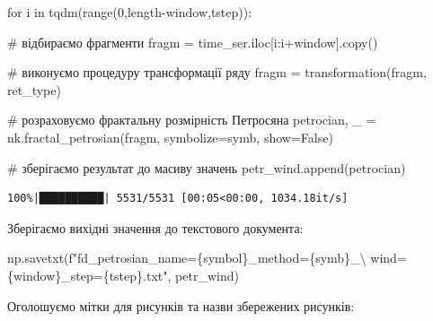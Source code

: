 \documentclass[
  letterpaper,
]{report}
\newenvironment{Shaded}{\begin{snugshade}}{\end{snugshade}}
\newcommand{\BuiltInTok}[1]{\textcolor[rgb]{0.00,0.23,0.31}{#1}}
\newcommand{\CharTok}[1]{\textcolor[rgb]{0.13,0.47,0.30}{#1}}
\newcommand{\CommentTok}[1]{\textcolor[rgb]{0.37,0.37,0.37}{#1}}
\newcommand{\ControlFlowTok}[1]{\textcolor[rgb]{0.00,0.23,0.31}{#1}}
\newcommand{\DecValTok}[1]{\textcolor[rgb]{0.68,0.00,0.00}{#1}}
\newcommand{\KeywordTok}[1]{\textcolor[rgb]{0.00,0.23,0.31}{#1}}
\newcommand{\NormalTok}[1]{\textcolor[rgb]{0.00,0.23,0.31}{#1}}
\newcommand{\OperatorTok}[1]{\textcolor[rgb]{0.37,0.37,0.37}{#1}}
\newcommand{\SpecialCharTok}[1]{\textcolor[rgb]{0.37,0.37,0.37}{#1}}
\newcommand{\SpecialStringTok}[1]{\textcolor[rgb]{0.13,0.47,0.30}{#1}}
\newcommand{\VariableTok}[1]{\textcolor[rgb]{0.07,0.07,0.07}{#1}}
\begin{document}
\begin{Shaded}
\begin{Highlighting}[]
\ControlFlowTok{for}\NormalTok{ i }\KeywordTok{in}\NormalTok{ tqdm(}\BuiltInTok{range}\NormalTok{(}\DecValTok{0}\NormalTok{,length}\OperatorTok{{-}}\NormalTok{window,tstep)):}
    
    \CommentTok{\# відбираємо фрагменти}
\NormalTok{    fragm }\OperatorTok{=}\NormalTok{ time\_ser.iloc[i:i}\OperatorTok{+}\NormalTok{window].copy()  }

    \CommentTok{\# виконуємо процедуру трансформації ряду }
\NormalTok{    fragm }\OperatorTok{=}\NormalTok{ transformation(fragm, ret\_type)}

    \CommentTok{\# розраховуємо фрактальну розмірність Петросяна}
\NormalTok{    petrocian, \_ }\OperatorTok{=}\NormalTok{ nk.fractal\_petrosian(fragm, }
\NormalTok{                                        symbolize}\OperatorTok{=}\NormalTok{symb, }
\NormalTok{                                        show}\OperatorTok{=}\VariableTok{False}\NormalTok{)}

    \CommentTok{\# зберігаємо результат до масиву значень}
\NormalTok{    petr\_wind.append(petrocian)}
\end{Highlighting}
\end{Shaded}

\begin{verbatim}
100%|██████████| 5531/5531 [00:05<00:00, 1034.18it/s]
\end{verbatim}

Зберігаємо вихідні значення до текстового документа:

\begin{Shaded}
\begin{Highlighting}[]
\NormalTok{np.savetxt(}\SpecialStringTok{f"fd\_petrosian\_name=}\SpecialCharTok{\{}\NormalTok{symbol}\SpecialCharTok{\}}\SpecialStringTok{\_method=}\SpecialCharTok{\{}\NormalTok{symb}\SpecialCharTok{\}}\SpecialStringTok{\_}\CharTok{\textbackslash{}}
\SpecialStringTok{           wind=}\SpecialCharTok{\{}\NormalTok{window}\SpecialCharTok{\}}\SpecialStringTok{\_step=}\SpecialCharTok{\{}\NormalTok{tstep}\SpecialCharTok{\}}\SpecialStringTok{.txt"}\NormalTok{, petr\_wind)}
\end{Highlighting}
\end{Shaded}

Оголошуємо мітки для рисунків та назви збережених рисунків:
\end{document}
